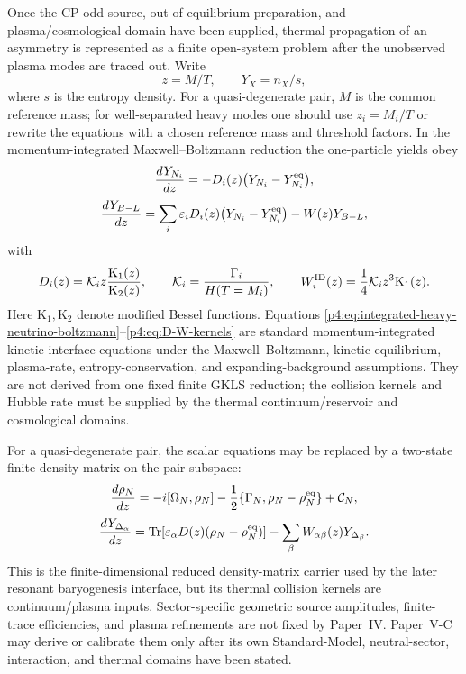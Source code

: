 \documentclass[12pt,a4paper]{article}
\begin{document}
Once the CP-odd source, out-of-equilibrium preparation, and plasma/cosmological
domain have been supplied, thermal propagation of an asymmetry is represented
as a finite open-system problem after the unobserved plasma modes are traced
out.  Write
\[
z=M/T,
\qquad
Y_X=n_X/s,
\]
where \(s\) is the entropy density. For a quasi-degenerate pair, \(M\) is the common reference mass; for well-separated heavy modes one should use \(z_i=M_i/T\) or rewrite the equations with a chosen reference mass and threshold factors. In the momentum-integrated Maxwell--Boltzmann
reduction the one-particle yields obey
\begin{equation}
\label{p4:eq:integrated-heavy-neutrino-boltzmann}
\frac{dY_{N_i}}{dz}
=
-D_i(z)\bigl(Y_{N_i}-Y_{N_i}^{\rm eq}\bigr),
\end{equation}
\begin{equation}
\label{p4:eq:integrated-BL-boltzmann}
\frac{dY_{B-L}}{dz}
=
\sum_i \varepsilon_iD_i(z)\bigl(Y_{N_i}-Y_{N_i}^{\rm eq}\bigr)
-
W(z)Y_{B-L},
\end{equation}
with
\begin{equation}
\label{p4:eq:D-W-kernels}
D_i(z)=\mathcal K_i z\frac{\mathrm K_1(z)}{\mathrm K_2(z)},
\qquad
\mathcal K_i=\frac{\Gamma_i}{H(T=M_i)},
\qquad
W_i^{\rm ID}(z)=\frac14\mathcal K_i z^3\mathrm K_1(z).
\end{equation}
Here \(\mathrm K_1,\mathrm K_2\) denote modified Bessel functions.  Equations
\eqref{p4:eq:integrated-heavy-neutrino-boltzmann}--\eqref{p4:eq:D-W-kernels}
are standard momentum-integrated kinetic interface equations under the
Maxwell--Boltzmann, kinetic-equilibrium, plasma-rate, entropy-conservation,
and expanding-background assumptions.  They are not derived from one fixed
finite GKLS reduction; the collision kernels and Hubble rate must be supplied
by the thermal continuum/reservoir and cosmological domains.

For a quasi-degenerate pair, the scalar equations may be replaced by a two-state
finite density matrix on the pair subspace:
\begin{equation}
\label{p4:eq:two-state-thermal-density-matrix}
\frac{d\rho_N}{dz}
=
-i[\Omega_N,\rho_N]
-
\frac12\{\Gamma_N,\rho_N-\rho_N^{\rm eq}\}
+\mathcal C_N,
\end{equation}
\begin{equation}
\label{p4:eq:flavored-asymmetry-density-matrix}
\frac{dY_{\Delta_\alpha}}{dz}
=
{\rm Tr}\!\left[\varepsilon_\alpha D(z)(\rho_N-\rho_N^{\rm eq})\right]
-
\sum_\beta W_{\alpha\beta}(z)Y_{\Delta_\beta}.
\end{equation}
This is the finite-dimensional reduced density-matrix carrier used by the
later resonant baryogenesis interface, but its thermal collision kernels are
continuum/plasma inputs.  Sector-specific geometric source amplitudes,
finite-trace efficiencies, and plasma refinements are not fixed by
Paper~IV.  Paper~V-C may derive or calibrate them only after its own
Standard-Model, neutral-sector, interaction, and thermal domains have been
stated.
\end{document}

